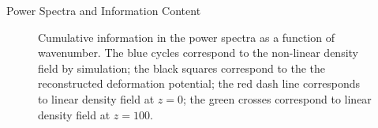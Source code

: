 \begin{section}{Power Spectra and Information Content}
\begin{figure}[t!]
\begin{center}
   \caption{Cumulative information in the power spectra as a function of wavenumber. The blue cycles correspond to the non-linear density field by simulation; the black squares correspond to the the reconstructed deformation potential; the red dash line corresponds to linear density field at $z=0$; the green crosses correspond to linear density field at $z=100$.}
  \label{fig:fisherinfo}
 \end{center}
\end{figure}


\end{section}
